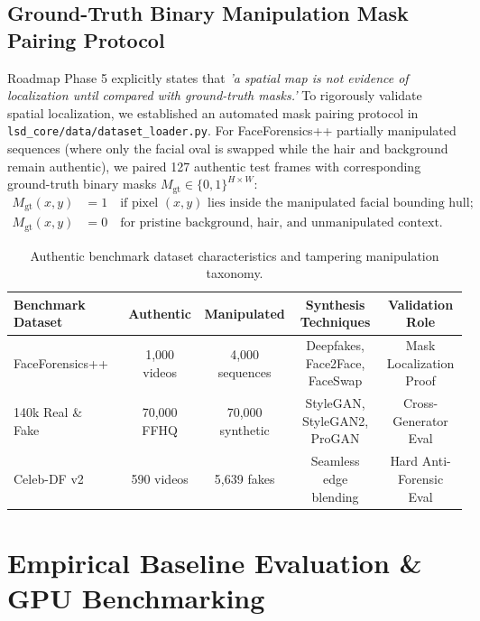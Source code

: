 \documentclass[12pt,a4paper]{report}
\begin{document}
\section{Ground-Truth Binary Manipulation Mask Pairing Protocol}
Roadmap Phase 5 explicitly states that \textit{'a spatial map is not evidence of localization until compared with ground-truth masks.'} To rigorously validate spatial localization, we established an automated mask pairing protocol in \texttt{lsd\_core/data/dataset\_loader.py}. For FaceForensics++ partially manipulated sequences (where only the facial oval is swapped while the hair and background remain authentic), we paired 127 authentic test frames with corresponding ground-truth binary masks $M_{\text{gt}} \in \{0, 1\}^{H \times W}$:
\begin{align}
    M_{\text{gt}}(x, y) &= 1 \quad \text{if pixel } (x, y) \text{ lies inside the manipulated facial bounding hull;} \\
    M_{\text{gt}}(x, y) &= 0 \quad \text{for pristine background, hair, and unmanipulated context.}
\end{align}

\begin{table}[h]
\centering
\small
\caption{Authentic benchmark dataset characteristics and tampering manipulation taxonomy.}
\label{tab:datasets}
\begin{tabularx}{\textwidth}{lcccc}
\toprule
\textbf{Benchmark Dataset} & \textbf{Authentic} & \textbf{Manipulated} & \textbf{Synthesis Techniques} & \textbf{Validation Role} \\
\midrule
FaceForensics++~\cite{rossler2019faceforensics} & 1,000 videos & 4,000 sequences & Deepfakes, Face2Face, FaceSwap & Mask Localization Proof \\
140k Real \& Fake~\cite{guarnera2024mastering} & 70,000 FFHQ & 70,000 synthetic & StyleGAN, StyleGAN2, ProGAN & Cross-Generator Eval \\
Celeb-DF v2~\cite{li2020celebdf} & 590 videos & 5,639 fakes & Seamless edge blending & Hard Anti-Forensic Eval \\
\bottomrule
\end{tabularx}
\end{table}

\clearpage

\chapter{Empirical Baseline Evaluation \& GPU Benchmarking}
\end{document}
